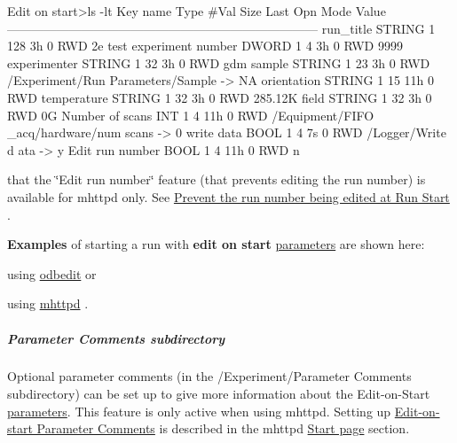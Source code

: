 \begin{DoxyCode}
Edit on start>ls -lt
Key name                        Type    #Val  Size  Last Opn Mode Value
---------------------------------------------------------------------------
run_title                       STRING  1     128   3h   0   RWD  2e test
experiment number               DWORD   1     4     3h   0   RWD  9999
experimenter                    STRING  1     32    3h   0   RWD  gdm
sample                          STRING  1     23    3h   0   RWD  /Experiment/Run
       Parameters/Sample -> NA
orientation                     STRING  1     15    11h  0   RWD  
temperature                     STRING  1     32    3h   0   RWD  285.12K
field                           STRING  1     32    3h   0   RWD  0G
Number of scans                 INT     1     4     11h  0   RWD  /Equipment/FIFO
      _acq/hardware/num scans -> 0
write data                      BOOL    1     4     7s   0   RWD  /Logger/Write d
      ata -> y
Edit run number                 BOOL    1     4     11h  0   RWD  n
\end{DoxyCode}


that the \char`\"{}Edit run number\char`\"{} feature (that prevents editing the run number) is available for mhttpd only. See \hyperlink{RC_mhttpd_Start_page_RC_Prevent_Edit_RN}{Prevent the run number being edited at Run Start} .

{\bfseries Examples} of starting a run with {\bfseries  edit on start } \hyperlink{structparameters}{parameters} are shown here:
\begin{DoxyItemize}
\item using \hyperlink{RC_odbedit_examples_RC_EOS_example2}{odbedit} or
\item using \hyperlink{RC_mhttpd_Start_page_RC_mhttpd_Edit_On_Start}{mhttpd} .
\end{DoxyItemize}\hypertarget{RC_customize_ODB_RC_parameter_comments}{}\subparagraph{Parameter Comments subdirectory}\label{RC_customize_ODB_RC_parameter_comments}
Optional parameter comments (in the /Experiment/Parameter Comments subdirectory) can be set up to give more information about the Edit-\/on-\/Start \hyperlink{structparameters}{parameters}. This feature is only active when using mhttpd. Setting up \hyperlink{RC_mhttpd_Start_page_RC_Edit_PC}{Edit-\/on-\/start Parameter Comments} is described in the mhttpd \hyperlink{RC_mhttpd_Start_page}{Start page} section. \par


